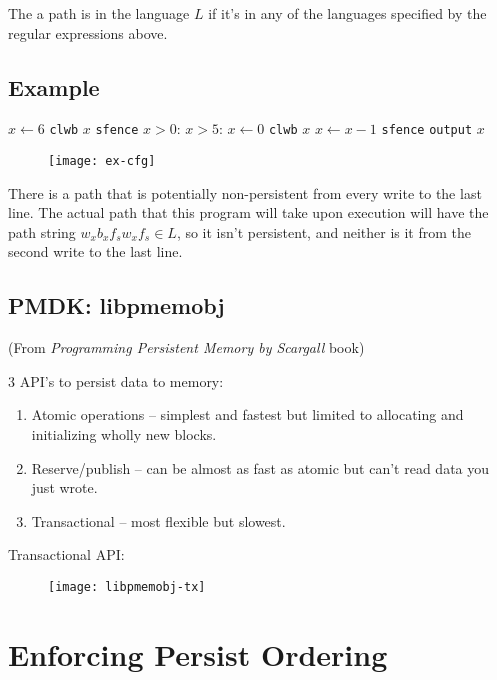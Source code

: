 \documentclass[11pt]{article}
\begin{document}
The a path is in the language $L$ if it's in any of the languages specified by the regular expressions above.

\newpage
\subsection{Example}
\begin{codebox}
  \li $x \gets 6$
  \li \texttt{clwb} $x$
  \li \texttt{sfence}
  \li \While $x > 0$:
  \Do
    \li \If $x>5$:
    \li \Then $x \gets 0$
        \li \texttt{clwb} $x$
    \li \Else
    \li $x \gets x - 1$
        \End
    \li \texttt{sfence}
  \End
  \li \texttt{output} $x$
\end{codebox}

\begin{figure}[h]
    \centering
    \texttt{[image: ex-cfg]}
\end{figure}
There is a path that is potentially non-persistent from every write to the last line. The actual path that this program will take upon execution will have the path string $w_x b_x f_s w_x f_s \in L$, so it isn't persistent, and neither is it from the second write to the last line.

\newpage
\subsection{PMDK: libpmemobj}
(From \textit{Programming Persistent Memory by Scargall} book)

3 API's to persist data to memory:
\begin{enumerate}
    \item Atomic operations -- simplest and fastest but limited to allocating and initializing wholly new blocks.
    \item Reserve/publish -- can be almost as fast as atomic but can't read data you just wrote.
    \item Transactional -- most flexible but slowest.
\end{enumerate}

\noindent Transactional API:
\begin{figure}[h]
    \texttt{[image: libpmemobj-tx]}
\end{figure}


\newpage
\section{Enforcing Persist Ordering}
\end{document}
